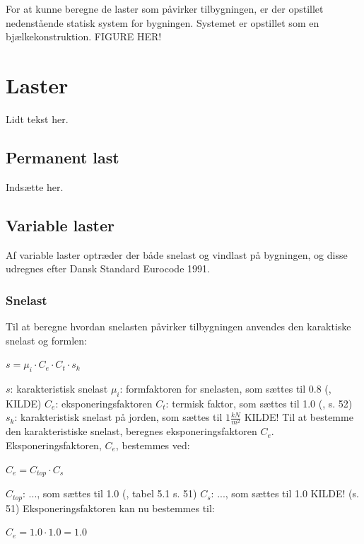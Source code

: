 For at kunne beregne de laster som påvirker tilbygningen, er der opstillet nedenstående statisk system for bygningen. Systemet er opstillet som en bjælkekonstruktion.
\newline
\newline
FIGURE HER!

\section{Laster}
Lidt tekst her.

\subsection{Permanent last}
Indsætte her.

\subsection{Variable laster}
Af variable laster optræder der både snelast og vindlast på bygningen, og disse udregnes efter Dansk Standard Eurocode 1991.

\subsubsection{Snelast}
Til at beregne hvordan snelasten påvirker tilbygningen anvendes den karaktiske snelast og formlen:
\begin{center}
$s=\mu_i\cdot C_e\cdot C_t \cdot s_k$
\end{center}
$s$: karakteristisk snelast
\newline
$\mu_i$: formfaktoren for snelasten, som sættes til 0.8 (\citep{EU91}, KILDE)
\newline
$C_e$: eksponeringsfaktoren
\newline
$C_t$: termisk faktor, som sættes til 1.0 (\citep{EU91}, s. 52)
\newline
$s_k$: karakteristisk snelast på jorden, som sættes til $1 \frac{kN}{m^2}$ KILDE!
\newline
\newline
Til at bestemme den karakteristiske snelast, beregnes eksponeringsfaktoren $C_e$.
\newline
\newline
Eksponeringsfaktoren, $C_e$, bestemmes ved:
\begin{center}
$C_e=C_{top}\cdot C_s$
\end{center}
$C_{top}$: ..., som sættes til 1.0 (\citep{EU91}, tabel 5.1 s. 51)
\newline
$C_s$: ..., som sættes til 1.0 KILDE! (s. 51)
\newline
\newline
Eksponeringsfaktoren kan nu bestemmes til:
\begin{center}
$C_e=1.0\cdot 1.0=1.0$
\end{center}

